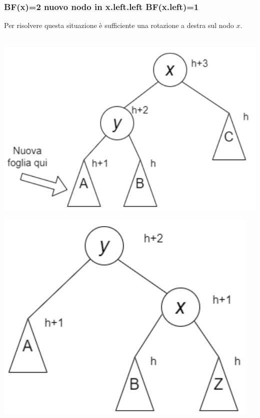 \documentclass[a4paper,12pt]{article}
\begin{document}
\subsubsection{BF(x)=2 \quad nuovo nodo in x.left.left \quad BF(x.left)=1}
Per risolvere questa situazione è sufficiente una rotazione a destra sul nodo $x$.\\\\
\begin{minipage}{0.4\textwidth}
    \centering
    \includegraphics[width=\linewidth]{rotazione 1.1.png}
\end{minipage}
\begin{minipage}{0.1\textwidth}
\hfill
\end{minipage}
\begin{minipage}{0.32\textwidth}
    \centering
    \includegraphics[width=\linewidth]{rotazione 1.2.png}
\end{minipage}
\end{document}
